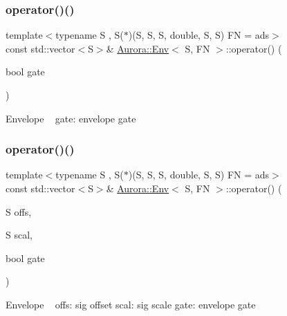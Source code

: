 \subsubsection{\texorpdfstring{operator()()}{operator()()}\hspace{0.1cm}{\footnotesize\ttfamily [4/6]}}
{\footnotesize\ttfamily template$<$typename S , S($\ast$)(\+S, S, S, double, S, S) FN = ads$>$ \\
const std\+::vector$<$S$>$\& \hyperlink{class_aurora_1_1_env}{Aurora\+::\+Env}$<$ S, FN $>$\+::operator() (\begin{DoxyParamCaption}\item[{bool}]{gate }\end{DoxyParamCaption})\hspace{0.3cm}{\ttfamily [inline]}}

Envelope ~\newline
gate\+: envelope gate \mbox{\label{class_aurora_1_1_env_a664e3c6ce7e66de66305ab220c116792}} 
\subsubsection{\texorpdfstring{operator()()}{operator()()}\hspace{0.1cm}{\footnotesize\ttfamily [5/6]}}
{\footnotesize\ttfamily template$<$typename S , S($\ast$)(\+S, S, S, double, S, S) FN = ads$>$ \\
const std\+::vector$<$S$>$\& \hyperlink{class_aurora_1_1_env}{Aurora\+::\+Env}$<$ S, FN $>$\+::operator() (\begin{DoxyParamCaption}\item[{S}]{offs,  }\item[{S}]{scal,  }\item[{bool}]{gate }\end{DoxyParamCaption})\hspace{0.3cm}{\ttfamily [inline]}}

Envelope ~\newline
offs\+: sig offset scal\+: sig scale gate\+: envelope gate \mbox{\label{class_aurora_1_1_env_aa60b54171a8ae1757d447aa42d5d00c7}} 
